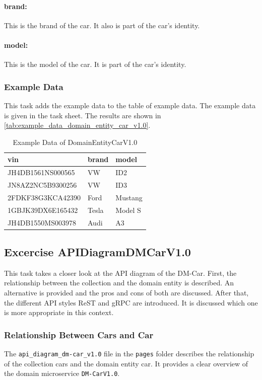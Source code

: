 \paragraph*{brand:}
This is the brand of the car.
It also is part of the car's identity.
\paragraph*{model:}
This is the model of the car.
It is part of the car's identity.

\subsubsection*{Example Data}
This task adds the example data to the table of example data.
The example data is given in the task sheet.
The results are shown in \autoref{tab:example_data_domain_entity_car_v1.0}.
\begin{table}
    \centering
    \caption{Example Data of DomainEntityCarV1.0}
    \label{tab:example_data_domain_entity_car_v1.0}
    \begin{tabular}{|p{5cm}|p{2cm}|p{2cm}|}
        \hline
        vin & brand & model \\
        \hline
        JH4DB1561NS000565 & VW & ID2 \\
        JN8AZ2NC5B9300256 & VW & ID3 \\
        2FDKF38G3KCA42390 & Ford & Mustang \\
        1GBJK39DX6E165432 & Tesla & Model S \\
        JH4DB1550MS003978 & Audi & A3 \\
        \hline
    \end{tabular}
\end{table}

\subsection{Excercise APIDiagramDMCarV1.0}
\label{subsec:api_diagram_dm_car_v1.0}
This task takes a closer look at the API diagram of the DM-Car.
First, the relationship between the collection and the domain entity is described.
An alternative is provided and the pros and cons of both are discussed.
After that, the different API styles ReST and gRPC are introduced.
It is discussed which one is more appropriate in this context.
\subsubsection*{Relationship Between Cars and Car}
The \texttt{api\_diagram\_dm-car\_v1.0} file in the \texttt{pages} folder describes the relationship of the collection cars and the domain entity car.
It provides a clear overview of the domain microservice \texttt{DM-CarV1.0}.

